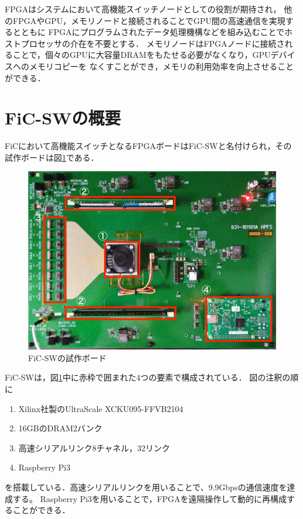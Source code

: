 {  FPGAはシステムにおいて高機能スイッチノードとしての役割が期待され，
  他のFPGAやGPU，メモリノードと接続されることでGPU間の高速通信を実現するとともに
  FPGAにプログラムされたデータ処理機構などを組み込むことでホストプロセッサの介在を不要とする．
  メモリノードはFPGAノードに接続されることで，個々のGPUに大容量DRAMをもたせる必要がなくなり，GPUデバイスへのメモリコピーを
  なくすことができ，メモリの利用効率を向上させることができる．
  
  \section{FiC-SWの概要}
  \label{sec:about_ficsw}
  FiCにおいて高機能スイッチとなるFPGAボードはFiC-SWと名付けられ，その試作ボードは図\ref{fig:ficsw}である．
  
  \begin{figure}[h]
    \centering
    \includegraphics[width=12cm]{./chap3/fig/ficsw.png}
    \caption{FiC-SWの試作ボード}
    \label{fig:ficsw}
  \end{figure}
  
  FiC-SWは，図\ref{fig:ficsw}中に赤枠で囲まれた4つの要素で構成されている．
  図の注釈の順に
  \begin{enumerate}
    \item Xilinx社製のUltraScale XCKU095-FFVB2104
    \item 16GBのDRAM2バンク
    \item 高速シリアルリンク8チャネル，32リンク
    \item Raspberry Pi3
  \end{enumerate}
  を搭載している．高速シリアルリンクを用いることで、9.9Gbpsの通信速度を達成する。
  Raspberry Pi3を用いることで，FPGAを遠隔操作して動的に再構成することができる．
  
}
